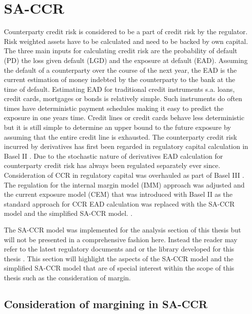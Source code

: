 \documentclass[../Thesis_AHoecherl.tex]{subfiles}
\begin{document}
\section{SA-CCR}\label{SA-CCR}

Counterparty credit risk is considered to be a part of credit risk by the regulator. Risk weighted assets have to be calculated and need to be backed by own capital. The three main inputs for calculating credit risk are the probability of default (PD) the loss given default (LGD) and the exposure at default (EAD). Assuming the default of a counterparty over the course of the next year, the EAD is the current estimation of money indebted by the counterparty to the bank at the time of default. Estimating EAD for traditional credit instruments s.a. loans, credit cards, mortgages or bonds is relatively simple. Such instruments do often times have deterministic payment schedules making it easy to predict the exposure in one years time. Credit lines or credit cards behave less deterministic but it is still simple to determine an upper bound to the future exposure by assuming that the entire credit line is exhausted.
The counterparty credit risk incurred by derivatives has first been regarded in regulatory capital calculation in Basel II \cite{basel2}. Due to the stochastic nature of derivatives EAD calculation for counterparty credit risk has always been regulated separately ever since. Consideration of \gls{CCR} in regulatory capital was overhauled as part of Basel III . The regulation for the internal margin model (\gls{IMM}) approach was adjusted and the current exposure model (\gls{CEM}) that was introduced with Basel II as the standard approach for \gls{CCR} \gls{EAD} calculation was replaced with the \gls{SA-CCR} model and the simplified \gls{SA-CCR} model. .

The \gls{SA-CCR} model was implemented for the analysis section of this thesis but will not be presented in a comprehensive fashion here. Instead the reader may refer to the latest regulatory documents  and  or the library developed for this thesis \cite{Hoecherl2020}.
This section will highlight the aspects of the SA-CCR model and the simplified SA-CCR model that are of special interest within the scope of this thesis such as the consideration of margin. 

\subsection{Consideration of margining in SA-CCR}
\end{document}
